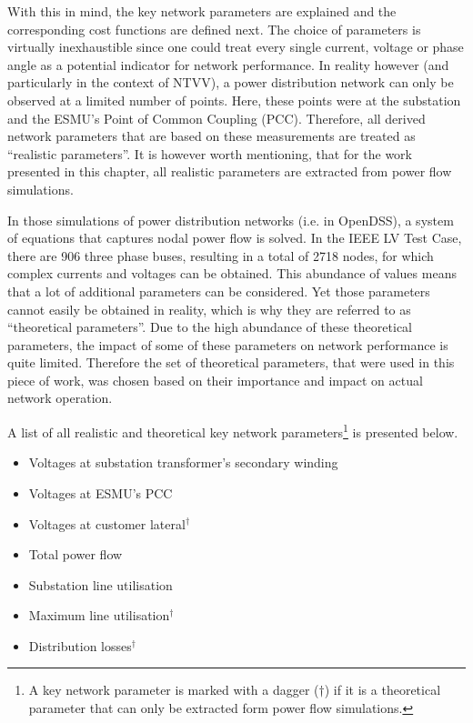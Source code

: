 With this in mind, the key network parameters are explained and the corresponding cost functions are defined next.
The choice of parameters is virtually inexhaustible since one could treat every single current, voltage or phase angle as a potential indicator for network performance.
In reality however (and particularly in the context of NTVV), a power distribution network can only be observed at a limited number of points.
Here, these points were at the substation and the ESMU's Point of Common Coupling (PCC).
Therefore, all derived network parameters that are based on these measurements are treated as ``realistic parameters''.
It is however worth mentioning, that for the work presented in this chapter, all realistic parameters are extracted from power flow simulations.

In those simulations of power distribution networks (i.e. in OpenDSS), a system of equations that captures nodal power flow is solved.
In the IEEE LV Test Case, there are 906 three phase buses, resulting in a total of 2718 nodes, for which complex currents and voltages can be obtained.
This abundance of values means that a lot of additional parameters can be considered.
Yet those parameters cannot easily be obtained in reality, which is why they are referred to as ``theoretical parameters''.
Due to the high abundance of these theoretical parameters, the impact of some of these parameters on network performance is quite limited.
Therefore the set of theoretical parameters, that were used in this piece of work, was chosen based on their importance and impact on actual network operation.

A list of all realistic and theoretical key network parameters\footnote{A key network parameter is marked with a dagger ($\dagger$) if it is a theoretical parameter that can only be extracted form power flow simulations.} is presented below.

\begin{itemize}
	\item Voltages at substation transformer's secondary winding
	\item Voltages at ESMU's PCC
	\item Voltages at customer lateral$^{\dagger}$
	\item Total power flow
	\item Substation line utilisation
	\item Maximum line utilisation$^{\dagger}$
	\item Distribution losses$^{\dagger}$
\end{itemize}


